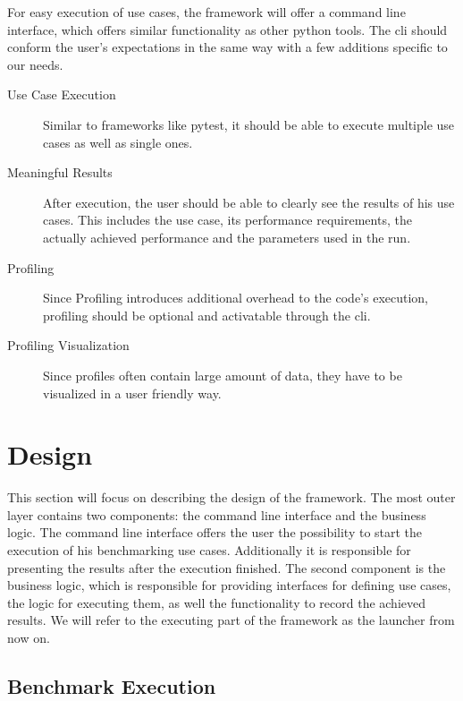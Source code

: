 For easy execution of use cases, the framework will offer a command line
interface, which offers similar functionality as other python tools. The
\gls{cli} should conform the user's expectations in the same way with a few
additions specific to our needs. 

\begin{description}
    \item[Use Case Execution]
        Similar to frameworks like pytest, it should be able to execute multiple
        use cases as well as single ones.
    \item[Meaningful Results]
        After execution, the user should be able to clearly see the results of
        his use cases. This includes the use case, its performance requirements,
        the actually achieved performance and the parameters used in the run.
    \item[Profiling]
        Since Profiling introduces additional overhead to the code's execution,
        profiling should be optional and activatable through the \gls{cli}.
    \item[Profiling Visualization]
        Since profiles often contain large amount of data, they have to be
        visualized in a user friendly way.
\end{description}



\section{Design}

\label{sec:application:design}

This section will focus on describing the design of the framework. The most
outer layer contains two components: the command line interface and the business
logic. The command line interface offers the user the possibility to start the
execution of his benchmarking use cases. Additionally it is responsible for
presenting the results after the execution finished. The second component is the
business logic, which is responsible for providing interfaces for defining use
cases, the logic for executing them, as well the functionality to record the
achieved results. We will refer to the executing part of the framework as the
launcher from now on.

\subsection{Benchmark Execution}

